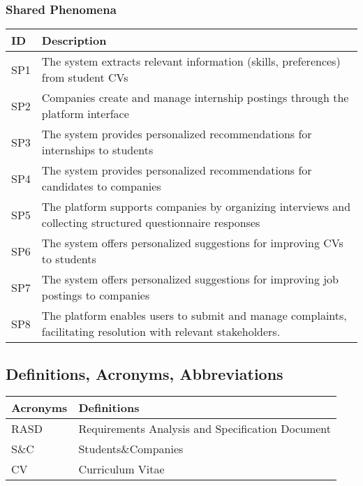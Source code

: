 \subsubsection{Shared Phenomena}
\begin{center}
    {\renewcommand{\arraystretch}{2}
    \begin{tabularx}{\textwidth}{p{2cm} X}
        \hline
        \textbf{ID} & \textbf{Description} \\ \hline
        SP1 & The system extracts relevant information (skills, preferences) from student CVs \\ \hline
        SP2 & Companies create and manage internship postings through the platform interface \\ \hline
        SP3 & The system provides personalized recommendations for internships to students \\ \hline
        SP4 & The system provides personalized recommendations for candidates to companies \\ \hline
        SP5 & The platform supports companies by organizing interviews and collecting structured questionnaire responses \\ \hline
        SP6 & The system offers personalized suggestions for improving CVs to students \\ \hline
        SP7 & The system offers personalized suggestions for improving job postings to companies \\ \hline 
        SP8 & The platform enables users to submit and manage complaints, facilitating resolution with relevant stakeholders. \\ \hline
    \end{tabularx}}
\end{center}

\subsection{Definitions, Acronyms, Abbreviations}

\setlength{\tabcolsep}{8pt} %
\renewcommand{\arraystretch}{1.5} %

\noindent\begin{tabular}{|p{3cm}|p{10cm}|} %
\hline
\textbf{Acronyms} & \textbf{Definitions} \\ \hline
RASD & Requirements Analysis and Specification Document \\ \hline
S\&C & Students\&Companies \\ \hline
CV & Curriculum Vitae \\ \hline
\end{tabular}

